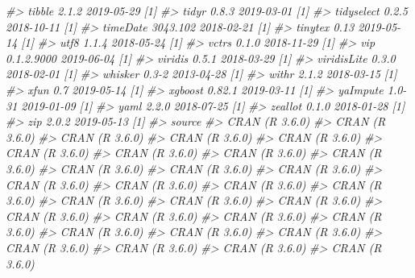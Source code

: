 \documentclass[]{krantz}
\makeatletter
\newenvironment{Shaded}{\begin{snugshade}}{\end{snugshade}}
\newcommand{\CommentTok}[1]{\textcolor[rgb]{0.37,0.37,0.37}{\textit{#1}}}
\newenvironment{kframe}{%
\medskip{}
\setlength{\fboxsep}{.8em}
 \def\at@end@of@kframe{}%
 \ifinner\ifhmode%
  \def\at@end@of@kframe{\end{minipage}}%
  \begin{minipage}{\columnwidth}%
 \fi\fi%
 \def\FrameCommand##1{\hskip\@totalleftmargin \hskip-\fboxsep
 \colorbox{shadecolor}{##1}\hskip-\fboxsep
     \hskip-\linewidth \hskip-\@totalleftmargin \hskip\columnwidth}%
 \MakeFramed {\advance\hsize-\width
   \@totalleftmargin\z@ \linewidth\hsize
   \@setminipage}}%
 {\par\unskip\endMakeFramed%
 \at@end@of@kframe}
\renewenvironment{Shaded}{\begin{kframe}}{\end{kframe}}
\makeatother
\begin{document}
\begin{Shaded}
\begin{Highlighting}[]
\CommentTok{#>    tibble          2.1.2      2019-05-29 [1]}
\CommentTok{#>    tidyr           0.8.3      2019-03-01 [1]}
\CommentTok{#>    tidyselect      0.2.5      2018-10-11 [1]}
\CommentTok{#>    timeDate        3043.102   2018-02-21 [1]}
\CommentTok{#>    tinytex         0.13       2019-05-14 [1]}
\CommentTok{#>    utf8            1.1.4      2018-05-24 [1]}
\CommentTok{#>    vctrs           0.1.0      2018-11-29 [1]}
\CommentTok{#>    vip             0.1.2.9000 2019-06-04 [1]}
\CommentTok{#>    viridis         0.5.1      2018-03-29 [1]}
\CommentTok{#>    viridisLite     0.3.0      2018-02-01 [1]}
\CommentTok{#>    whisker         0.3-2      2013-04-28 [1]}
\CommentTok{#>    withr           2.1.2      2018-03-15 [1]}
\CommentTok{#>    xfun            0.7        2019-05-14 [1]}
\CommentTok{#>    xgboost         0.82.1     2019-03-11 [1]}
\CommentTok{#>    yaImpute        1.0-31     2019-01-09 [1]}
\CommentTok{#>    yaml            2.2.0      2018-07-25 [1]}
\CommentTok{#>    zeallot         0.1.0      2018-01-28 [1]}
\CommentTok{#>    zip             2.0.2      2019-05-13 [1]}
\CommentTok{#>  source                         }
\CommentTok{#>  CRAN (R 3.6.0)                 }
\CommentTok{#>  CRAN (R 3.6.0)                 }
\CommentTok{#>  CRAN (R 3.6.0)                 }
\CommentTok{#>  CRAN (R 3.6.0)                 }
\CommentTok{#>  CRAN (R 3.6.0)                 }
\CommentTok{#>  CRAN (R 3.6.0)                 }
\CommentTok{#>  CRAN (R 3.6.0)                 }
\CommentTok{#>  CRAN (R 3.6.0)                 }
\CommentTok{#>  CRAN (R 3.6.0)                 }
\CommentTok{#>  CRAN (R 3.6.0)                 }
\CommentTok{#>  CRAN (R 3.6.0)                 }
\CommentTok{#>  CRAN (R 3.6.0)                 }
\CommentTok{#>  CRAN (R 3.6.0)                 }
\CommentTok{#>  CRAN (R 3.6.0)                 }
\CommentTok{#>  CRAN (R 3.6.0)                 }
\CommentTok{#>  CRAN (R 3.6.0)                 }
\CommentTok{#>  CRAN (R 3.6.0)                 }
\CommentTok{#>  CRAN (R 3.6.0)                 }
\CommentTok{#>  CRAN (R 3.6.0)                 }
\CommentTok{#>  CRAN (R 3.6.0)                 }
\CommentTok{#>  CRAN (R 3.6.0)                 }
\CommentTok{#>  CRAN (R 3.6.0)                 }
\CommentTok{#>  CRAN (R 3.6.0)                 }
\CommentTok{#>  CRAN (R 3.6.0)                 }
\CommentTok{#>  CRAN (R 3.6.0)                 }
\CommentTok{#>  CRAN (R 3.6.0)                 }
\CommentTok{#>  CRAN (R 3.6.0)                 }
\CommentTok{#>  CRAN (R 3.6.0)                 }
\CommentTok{#>  CRAN (R 3.6.0)                 }
\CommentTok{#>  CRAN (R 3.6.0)                 }

\end{Highlighting}
\end{Shaded}
\end{document}
